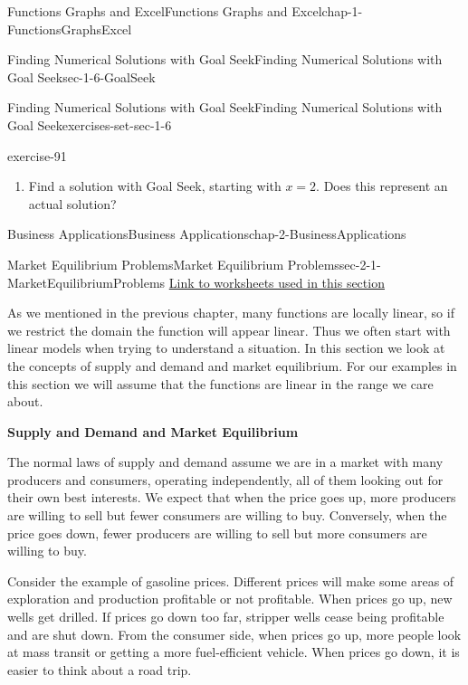 \documentclass[oneside,10pt,]{book}
\newcommand{\terminology}[1]{\textbf{#1}}
\numberwithin{equation}{section}
\begin{document}
\begin{chapterptx}{Functions Graphs and Excel}{}{Functions Graphs and Excel}{}{}{chap-1-FunctionsGraphsExcel}
\begin{sectionptx}{Finding Numerical Solutions with Goal Seek}{}{Finding Numerical Solutions with Goal Seek}{}{}{sec-1-6-GoalSeek}
\begin{exercises-subsection-numberless}{Finding Numerical Solutions with Goal Seek}{}{Finding Numerical Solutions with Goal Seek}{}{}{exercises-set-sec-1-6}
\begin{divisionexercise}{16}{}{}{exercise-91}
\begin{enumerate}[label=(\alph*)]
\item\hypertarget{li-160}{}\hypertarget{p-547}{}%
Find a solution with Goal Seek, starting with \(x=2\).  Does this represent an actual solution?%
\end{enumerate}
\end{divisionexercise}%
\end{exercises-subsection-numberless}
\end{sectionptx}
\end{chapterptx}
%
%
\typeout{************************************************}
\typeout{************************************************}
%
\begin{chapterptx}{Business Applications}{}{Business Applications}{}{}{chap-2-BusinessApplications}
%
%
\typeout{************************************************}
\typeout{************************************************}
%
\begin{sectionptx}{Market Equilibrium Problems}{}{Market Equilibrium Problems}{}{}{sec-2-1-MarketEquilibriumProblems}
\hypertarget{p-548}{}%
\href{./Examples/Section-2-1-Examples.xlsx}{Link to worksheets used in this section}%
\par
\hypertarget{p-549}{}%
As we mentioned in the previous chapter, many functions are locally linear, so if we restrict the domain the function will appear linear.  Thus we often start with linear models when trying to understand a situation.  In this section we look at the concepts of supply and demand and market equilibrium.  For our examples in this section we will assume that the functions are linear in the range we care about.%
\par
\hypertarget{p-550}{}%
\terminology{Supply and Demand and Market Equilibrium}%
\par
\hypertarget{p-551}{}%
The normal laws of supply and demand assume we are in a market with many producers and consumers, operating independently, all of them looking out for their own best interests.  We expect that when the price goes up, more producers are willing to sell but fewer consumers are willing to buy.  Conversely, when the price goes down, fewer producers are willing to sell but more consumers are willing to buy.%
\par
\hypertarget{p-552}{}%
Consider the example of gasoline prices.  Different prices will make some areas of exploration and production profitable or not profitable.  When prices go up, new wells get drilled. If prices go down too far, stripper wells cease being profitable and are shut down. From the consumer side, when prices go up, more people look at mass transit or getting a more fuel-efficient vehicle.  When prices go down, it is easier to think about a road trip.%

\end{sectionptx}
\end{chapterptx}
\end{document}
